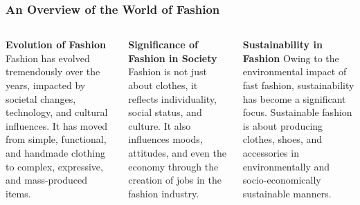 \documentclass[5pt]{beamer}
\begin{document}
\begin{frame}
\frametitle{An Overview of the World of Fashion}
\begin{columns}
\begin{column}{0.3\textwidth}
\begin{block}{\textbf{Evolution of Fashion}}
Fashion has evolved tremendously over the years, impacted by societal changes, technology, and cultural influences. It has moved from simple, functional, and handmade clothing to complex, expressive, and mass-produced items.
\end{block}
\end{column}
\begin{column}{0.3\textwidth}
\begin{block}{\textbf{Significance of Fashion in Society}}
Fashion is not just about clothes, it reflects individuality, social status, and culture. It also influences moods, attitudes, and even the economy through the creation of jobs in the fashion industry.
\end{block}
\end{column}
\begin{column}{0.3\textwidth}
\begin{block}{\textbf{Sustainability in Fashion}}
Owing to the environmental impact of fast fashion, sustainability has become a significant focus. Sustainable fashion is about producing clothes, shoes, and accessories in environmentally and socio-economically sustainable manners.
\end{block}
\end{column}
\end{columns}
\end{frame}
\end{document}
